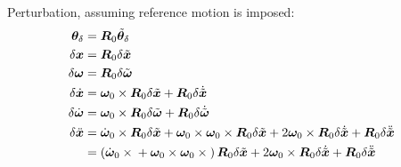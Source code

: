 \documentclass[10pt,dvips,fleqn,subeqn]{report}
\newcommand{\T}[1]{\bm{#1}}
\newcommand{\TT}[1]{\bm{#1}}
\begin{document}
Perturbation, assuming reference motion is imposed:
\begin{subequations}
\begin{align}
	\T{\theta}_{\delta}
	&= \TT{R}_0 \tilde{\T{\theta}}_{\delta} \\
	\delta\T{x} &= \TT{R}_0 \delta\tilde{\T{x}} \\
	\delta\T{\omega} &= \TT{R}_0 \delta\tilde{\T{\omega}} \\
	\delta\dot{\T{x}} &= 
		\T{\omega}_0 \times \TT{R}_0 \delta\tilde{\T{x}}
		+ \TT{R}_0 \delta\dot{\tilde{\T{x}}} \\
	\delta\dot{\T{\omega}} &= 
		\T{\omega}_0 \times \TT{R}_0 \delta\tilde{\T{\omega}}
		+ \TT{R}_0 \delta\dot{\tilde{\T{\omega}}} \\
	\delta\ddot{\T{x}}
		&= \dot{\T{\omega}}_0 \times \TT{R}_0 \delta\tilde{\T{x}}
		+ \T{\omega}_0 \times \T{\omega}_0 \times \TT{R}_0 \delta\tilde{\T{x}}
		+ 2 \T{\omega}_0 \times \TT{R}_0 \delta\dot{\tilde{\T{x}}}
		+ \TT{R}_0 \delta\ddot{\tilde{\T{x}}}
		\nonumber \\
		&= \plbr{
			\dot{\T{\omega}}_0 \times{}
			+ \T{\omega}_0 \times \T{\omega}_0 \times{}
		} \TT{R}_0 \delta\tilde{\T{x}}
		+ 2 \T{\omega}_0 \times \TT{R}_0 \delta\dot{\tilde{\T{x}}}
		+ \TT{R}_0 \delta\ddot{\tilde{\T{x}}}
\end{align}
\end{subequations}
\end{document}
